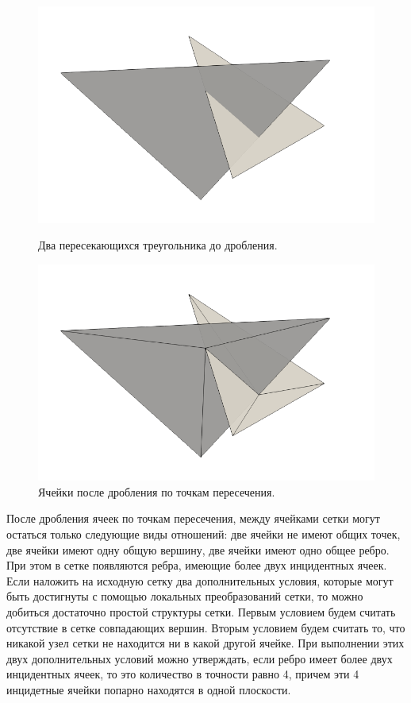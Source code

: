 \begin{figure}[h]
  \centering
  \begin{minipage}[h]{0.4\textwidth}
    \includegraphics[width=\textwidth]{pics/pic_before_cut.png}
    \caption{Два пересекающихся треугольника до дробления.}\label{fig:pic_before_cut}
  \end{minipage}
  \begin{minipage}[h]{0.4\textwidth}
    \includegraphics[width=\textwidth]{pics/pic_after_cut.png}
    \caption{Ячейки после дробления по точкам пересечения.}\label{fig:pic_after_cut}
  \end{minipage}
\end{figure}

После дробления ячеек по точкам пересечения, между ячейками сетки могут остаться только следующие виды отношений: две ячейки не имеют общих точек, две ячейки имеют одну общую вершину, две ячейки имеют одно общее ребро.
При этом в сетке появляются ребра, имеющие более двух инцидентных ячеек.
Если наложить на исходную сетку два дополнительных условия, которые могут быть достигнуты с помощью локальных преобразований сетки, то можно добиться достаточно простой структуры сетки.
Первым условием будем считать отсутствие в сетке совпадающих вершин.
Вторым условием будем считать то, что никакой узел сетки не находится ни в какой другой ячейке.
При выполнении этих двух дополнительных условий можно утверждать, если ребро имеет более двух инцидентных ячеек, то это количество в точности равно 4, причем эти 4 инцидетные ячейки попарно находятся в одной плоскости.

